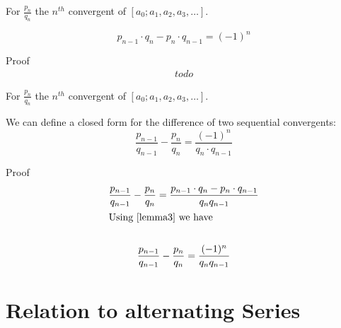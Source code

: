 \documentclass[a4paper]{article}
\begin{document}
    \begin{lemma}
        \label{lemma3}
        For $\frac{p_{n}}{q_n}$ the $n^{th}$ convergent of $[a_0; a_1, a_2, a_3, \dots]$.

        \[
        p_{n-1} \cdot q_n - p_{n} \cdot q_{n-1} = (-1)^n
        \]

        Proof
        \begin{gather*}
            todo
        \end{gather*}
    \end{lemma}

    \begin{lemma}
        \label{lemma2}
        For $\frac{p_{n}}{q_n}$ the $n^{th}$ convergent of $[a_0; a_1, a_2, a_3, \dots]$.

        We can define a closed form for the difference of two sequential convergents:
        \[
        \frac{p_{n-1}}{q_{n-1}} - \frac{p_{n}}{q_n} = \frac{(-1)^n}{q_n \cdot q_{n-1}}
        \]

        Proof
        \begin{gather*}
            \frac{p_{n-1}}{q_{n-1}} - \frac{p_{n}}{q_n}
            = \frac{p_{n-1} \cdot q_n - p_{n} \cdot q_{n-1}}{q_{n} q_{n-1}}  \\
            \shortintertext{Using \cref{lemma3} we have} \\
            \frac{p_{n-1}}{q_{n-1}} - \frac{p_{n}}{q_n} = \frac{(-1)^n}{q_{n} q_{n-1}}
        \end{gather*}
    \end{lemma}


    \section{Relation to alternating Series}\label{sec:relation-to-alternating-series}
\end{document}
